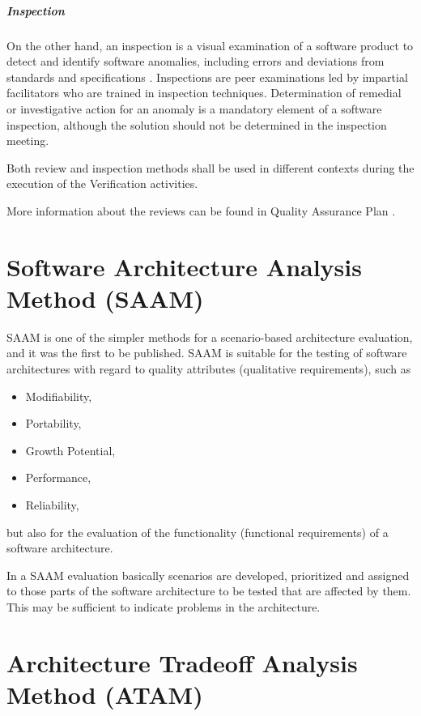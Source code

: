 \paragraph{Inspection}
On the other hand, an inspection is a visual examination of a software
product to detect and identify software anomalies, including errors
and deviations from standards and specifications
\cite{Fag76-99}. Inspections are peer examinations led by impartial
facilitators who are trained in inspection techniques. Determination
of remedial or investigative action for an anomaly is a mandatory
element of a software inspection, although the solution should not be
determined in the inspection meeting.

Both review and inspection methods shall be used in different
contexts during the execution of the Verification activities.

More information about the reviews can be found in Quality Assurance Plan
\cite{QAplan}.

\chapter{Software Architecture Analysis Method (SAAM)}

SAAM \cite{KABC96} is one of the simpler methods for a scenario-based
architecture evaluation, and it was the first to be published. SAAM is
suitable for the testing of software architectures with regard to
quality attributes (qualitative requirements), such as
%
\begin{itemize}
\item Modifiability,
\item Portability,
\item Growth Potential,
\item Performance,
\item Reliability,
\end{itemize}
%
but also for the evaluation of the functionality (functional 
requirements) of a software architecture. 

In a SAAM evaluation basically scenarios are developed, 
prioritized and assigned to those parts of the software 
architecture to be tested that are affected by them. 
This may be sufficient to indicate problems in the architecture.

\chapter{Architecture Tradeoff Analysis Method (ATAM)}	
\label{sec:atam}


